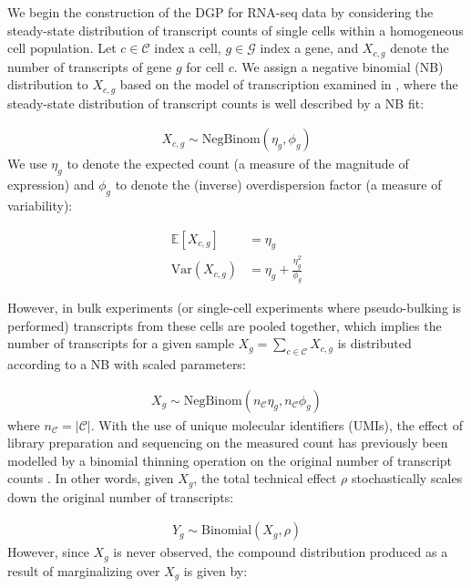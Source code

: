 \documentclass[10pt,letterpaper]{article}
\begin{document}
We begin the construction of the DGP for RNA-seq data by considering the steady-state distribution of transcript counts of single cells within a homogeneous cell population.
Let $c \in \mathcal{C}$ index a cell, $g \in \mathcal{G}$ index a gene, and $X_{c,g}$ denote the number of transcripts of gene $g$ for cell $c$.
We assign a negative binomial (NB) distribution to $X_{c,g}$ based on the model of transcription examined in \cite{corriganContinuumModelTranscriptional2016}, where the steady-state distribution of transcript counts is well described by a NB fit:

\begin{align*}
    X_{c,g} \sim \text{NegBinom}(\eta_g, \phi_g)
\end{align*}
We use $\eta_g$ to denote the expected count (a measure of the magnitude of expression) and $\phi_g$ to denote the (inverse) overdispersion factor (a measure of variability):

\begin{subequations}
    \begin{align}
        \mathbb{E}[X_{c,g}] &= \eta_g \\
        \text{Var}(X_{c,g}) &= \eta_g + \frac{\eta_g^2}{\phi_g}
    \end{align}
\end{subequations}

However, in bulk experiments (or single-cell experiments where pseudo-bulking is performed) transcripts from these cells are pooled together, which implies the number of transcripts for a given sample $X_g = \sum_{c \in \mathcal{C}} X_{c,g}$ is distributed according to a NB with scaled parameters:

\begin{align}
    X_g \sim \text{NegBinom}(n_{\mathcal{C}} \eta_g, n_{\mathcal{C}} \phi_g)
\end{align}
where $n_{\mathcal{C}} = |\mathcal{C}|$.
With the use of unique molecular identifiers (UMIs), the effect of library preparation and sequencing on the measured count has previously been modelled by a binomial thinning operation \cite{kellaBinomialThinningMixing2023} on the original number of transcript counts \cite{schwabeRelationInputOutput2022}. 
In other words, given $X_g$, the total technical effect $\rho$ stochastically scales down the original number of transcripts:

\begin{align}
    Y_g \sim \text{Binomial}(X_g, \rho) \label{tech_effect}
\end{align}
However, since $X_g$ is never observed, the compound distribution produced as a result of marginalizing over $X_g$ is given by:
\end{document}
